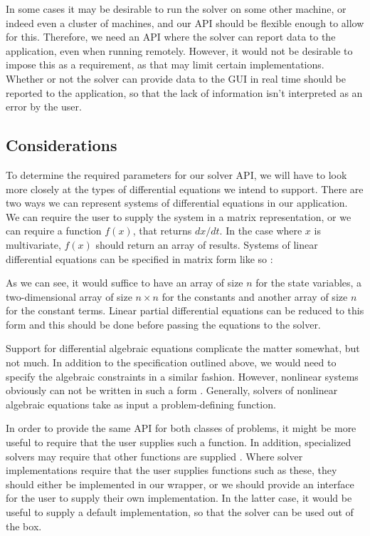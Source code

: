 \documentclass[\rootfolder/main.tex]{subfiles}
\begin{document}
In some cases it may be desirable to run the solver on some other machine, or indeed even a cluster of machines, and our API should be flexible enough to allow for this.
Therefore, we need an API where the solver can report data to the application, even when running remotely.
However, it would not be desirable to impose this as a requirement, as that may limit certain implementations.
Whether or not the solver can provide data to the GUI in real time should be reported to the application, so that the lack of information isn't interpreted as an error by the user.

\subsection{Considerations}

To determine the required parameters for our solver API, we will have to look more closely at the types of differential equations we intend to support.
There are two ways we can represent systems of differential equations in our application.
We can require the user to supply the system in a matrix representation, or we can require a function $f(x)$, that returns $dx/dt$.
In the case where $x$ is multivariate, $f(x)$ should return an array of results.
Systems of linear differential equations can be specified in matrix form like so \cite{kreyzig}:


As we can see, it would suffice to have an array of size $n$ for the state variables,
a two-dimensional array of size $n \times n$ for the constants and another array of size $n$ for the constant terms.
Linear partial differential equations can be reduced to this form and this should be done before passing the equations to the solver.

Support for differential algebraic equations complicate the matter somewhat, but not much.
In addition to the specification outlined above, we would need to specify the algebraic constraints in a similar fashion.
However, nonlinear systems obviously can not be written in such a form \cite{khalil}.
Generally, solvers of nonlinear algebraic equations take as input a problem-defining function.

In order to provide the same API for both classes of problems, it might be more useful to require that the user supplies such a function.
In addition, specialized solvers may require that other functions are supplied \cite{kinsol}\cite{cvode}\cite{ida}.
Where solver implementations require that the user supplies functions such as these, they should either be implemented in our wrapper,
or we should provide an interface for the user to supply their own implementation.
In the latter case, it would be useful to supply a default implementation, so that the solver can be used out of the box.
\end{document}

